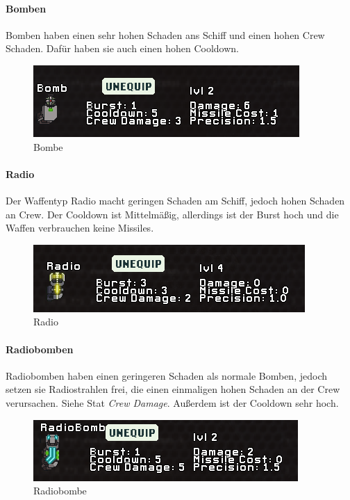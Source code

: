\documentclass[fontsize=12pt,paper=a4,twoside]{scrartcl}
\begin{document}
\paragraph{Bomben}

Bomben haben einen sehr hohen Schaden ans Schiff und einen hohen Crew Schaden. Dafür haben sie auch einen hohen Cooldown. 

\begin{figure}[H]
\centering
\includegraphics[width=1\linewidth]{DasSpiel/Kampf/waffen/bomb.png}
\caption{Bombe}
\end{figure}

\paragraph{Radio}

Der Waffentyp Radio macht geringen Schaden am Schiff, jedoch hohen Schaden an Crew. Der Cooldown ist Mittelmäßig, allerdings ist der Burst hoch und die Waffen verbrauchen keine Missiles. 

\begin{figure}[H]
\centering
\includegraphics[width=1\linewidth]{DasSpiel/Kampf/waffen/radio.png}
\caption{Radio}
\end{figure}

\paragraph{Radiobomben}

Radiobomben haben einen geringeren Schaden als normale Bomben, jedoch setzen sie Radiostrahlen frei, die einen einmaligen hohen Schaden an der Crew verursachen. Siehe Stat \textit{Crew Damage}. Außerdem ist der Cooldown sehr hoch. 

\begin{figure}[H]
\centering
\includegraphics[width=1\linewidth]{DasSpiel/Kampf/waffen/radiobo.png}
\caption{Radiobombe}
\end{figure}
\end{document}
